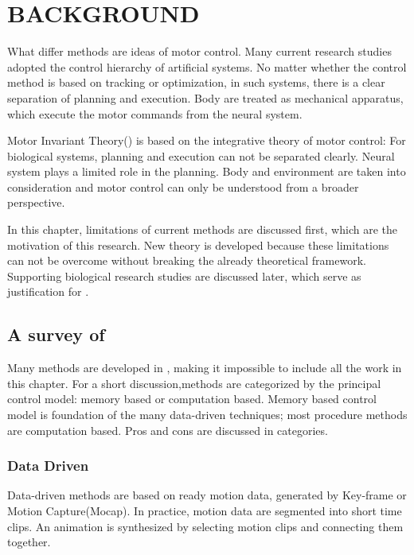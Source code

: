 \chapter{BACKGROUND}
\label{chap:background}

What differ \cms methods are ideas of motor control.
Many current \cms research studies adopted the control hierarchy of artificial systems.
No matter whether the control method is based on tracking or optimization, in such systems, there is a clear separation of planning and execution.
Body are treated as mechanical apparatus, which execute the motor commands from the neural system.

Motor Invariant Theory(\moit) is based on the integrative theory of motor control\citep{dickinson2000animals}:
For biological systems, planning and execution can not be separated clearly.
Neural system plays a limited role in the planning.
Body and environment are taken into consideration and motor control can only be understood from a broader perspective.

In this chapter, limitations of current \cms methods are discussed first, which are the motivation of this research.
New theory is developed because these limitations can not be overcome without breaking the already theoretical framework.
Supporting biological research studies are discussed later,  which serve as justification for \moit.



\section{A survey of \cms}

Many methods are developed in \cms, making it impossible to include all the work in this chapter.
For a short discussion,\cms methods are categorized by the principal control model: memory based or computation based.
Memory based control model is foundation of the  many data-driven techniques;
most procedure methods are computation based.
Pros and cons are discussed in categories.

\subsection{Data Driven}
Data-driven methods are based on ready motion data,  generated by Key-frame or Motion Capture(Mocap). 
In practice, motion data are segmented into short time clips. 
An animation is synthesized by selecting motion clips and connecting them together\citep{Parent2002,kovar2003flexible}.

